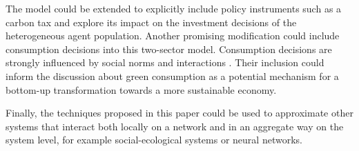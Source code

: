The model could be extended to explicitly include policy instruments such as a carbon tax and explore its impact on the investment decisions of the heterogeneous agent population.
Another promising modification could include consumption decisions into this two-sector model. Consumption decisions are strongly influenced by social norms and interactions \citep{Peattie2010}. Their inclusion could inform the discussion about green consumption as a potential mechanism for a bottom-up transformation towards a more sustainable economy.

Finally, the techniques proposed in this paper could be used to approximate other systems that interact both locally on a network and in an aggregate way on the system level, for example social-ecological systems or neural networks.

